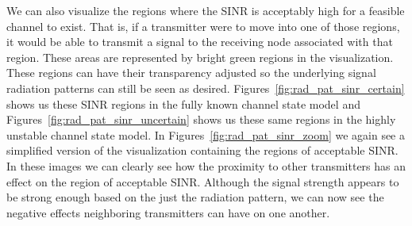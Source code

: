 We can also visualize the regions where the SINR is acceptably high for a feasible channel to exist.  That is, if a transmitter were to move into one of those regions, it would be able to transmit a signal to the receiving node associated with that region.  These areas are represented by bright green regions in the visualization.  These regions can have their transparency adjusted so the underlying signal radiation patterns can still be seen as desired.  Figures~\ref{fig:rad_pat_sinr_certain} shows us these SINR regions in the fully known channel state model and Figures~\ref{fig:rad_pat_sinr_uncertain} shows us these same regions in the highly unstable channel state model. In Figures~\ref{fig:rad_pat_sinr_zoom} we again see a simplified version of the visualization containing the regions of acceptable SINR.  In these images we can clearly see how the proximity to other transmitters has an effect on the region of acceptable SINR.  Although the signal strength appears to be strong enough based on the just the radiation pattern, we can now see the negative effects neighboring transmitters can have on one another.

